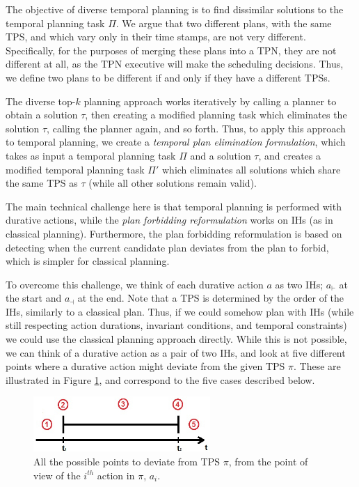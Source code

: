 The objective of diverse temporal planning is to find dissimilar solutions to the temporal planning task $\Pi$. We argue that two different plans, with the same TPS, and which vary only in their time stamps, are not very different. Specifically, for the purposes of merging these plans into a TPN, they are not different at all, as the TPN executive will make the scheduling decisions. Thus, we define two plans to be different if and only if they have a different TPSs.

The diverse top-$k$ planning approach \cite{katz2019reshaping} works iteratively by calling a planner to obtain a solution $\tau$, then creating a modified planning task which eliminates the solution $\tau$, calling the planner again, and so forth.
Thus, to apply this approach to temporal planning, we create a {\em temporal plan elimination formulation}, which takes as input a temporal planning task $\Pi$ and a solution $\tau$, and creates a modified temporal planning task $\Pi'$ which eliminates all solutions which share the same TPS as $\tau$ (while all other solutions remain valid).

The main technical challenge here is that temporal planning is performed with durative actions, while the {\em plan forbidding reformulation} \cite{katz2018novel} works on IHs (as in classical planning). Furthermore, the plan forbidding reformulation is based on detecting when the current candidate plan deviates from the plan to forbid, which is simpler for classical planning. 

To overcome this challenge, we think of each durative action $a$ as two IHs; $a_{\vdash}$ at the start and $a_{\dashv}$ at the end. Note that a TPS is determined by the order of the IHs, similarly to a classical plan. 
Thus, if we could somehow plan with IHs (while still respecting action durations, invariant conditions, and temporal constraints) we could use the classical planning approach directly.
While this is not possible, we can think of a durative action as a pair of two IHs, and look at five different points where a durative action might deviate from the given TPS $\pi$. These are illustrated in Figure \ref{fig:compilation}, and correspond to the five cases described below.

\begin{figure}
\centering
\includegraphics[width=0.6\textwidth]{graphics/compilation.jpg}
\caption{All the possible points to deviate from TPS $\pi$, from the point of view of the $i^{th}$ action in $\pi$, $a_i$.} \label{fig:compilation}
\end{figure}

